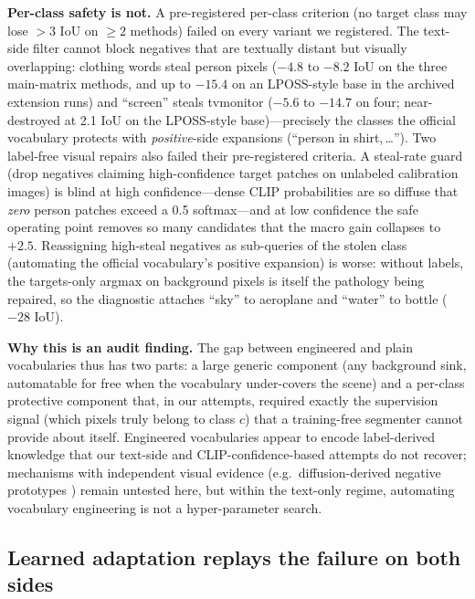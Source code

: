 \documentclass[11pt]{article}
\begin{document}
\textbf{Per-class safety is not.} A pre-registered per-class criterion (no target
class may lose ${>}3$ IoU on ${\geq}2$ methods) failed on every variant we registered.
The text-side filter cannot block negatives that are textually distant but visually
overlapping: clothing words steal person pixels ($-4.8$ to $-8.2$ IoU on the three
main-matrix methods, and up to $-15.4$ on an LPOSS-style base in the archived
extension runs) and ``screen'' steals tvmonitor ($-5.6$ to $-14.7$ on four;
near-destroyed at 2.1 IoU on the LPOSS-style base)---precisely the
classes the official vocabulary protects with \emph{positive}-side expansions
(``person in shirt,\,\ldots''). Two label-free visual repairs also failed their
pre-registered criteria. A steal-rate guard (drop negatives claiming high-confidence
target patches on unlabeled calibration images) is blind at high confidence---dense
CLIP probabilities are so diffuse that \emph{zero} person patches exceed a 0.5
softmax---and at low confidence the safe operating point removes so many candidates
that the macro gain collapses to $+2.5$. Reassigning high-steal negatives as
sub-queries of the stolen class (automating the official vocabulary's positive
expansion) is worse: without labels, the targets-only argmax on background pixels is
itself the pathology being repaired, so the diagnostic attaches ``sky'' to aeroplane
and ``water'' to bottle ($-28$ IoU).

\textbf{Why this is an audit finding.} The gap between engineered and plain
vocabularies thus has two parts: a large generic component (any background sink,
automatable for free when the vocabulary under-covers the scene) and a per-class
protective component that, in our attempts, required exactly the supervision signal
(which pixels truly belong to class $c$) that a training-free segmenter cannot
provide about itself. Engineered vocabularies appear to encode label-derived
knowledge that our text-side and CLIP-confidence-based attempts do not recover;
mechanisms with independent visual evidence (e.g.\ diffusion-derived negative
prototypes \citep{karazija2024ovdiff}) remain untested here, but within the
text-only regime, automating vocabulary engineering is not a hyper-parameter search.

\subsection{Learned adaptation replays the failure on both sides}
\label{sec:lexro}
\end{document}
